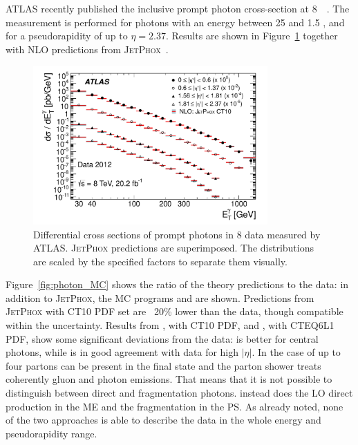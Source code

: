 \documentclass{PoS}
\providecommand{\JETPHOX} {{\textsc{JetPhox}}\xspace}
\begin{document}
ATLAS recently published the inclusive prompt photon cross-section at 8~\TeV~\cite{Aad:2016xcr}. The measurement is
performed for photons with an energy between 25 \GeV and 1.5 \TeV, and for a pseudorapidity of up to $\eta = 2.37$. 
Results are shown in Figure~\ref{fig:photon} together with NLO predictions from \JETPHOX~\cite{Catani:2002ny}. 
\begin{figure}
\begin{center}
\includegraphics[width=0.8\textwidth]{Figure11.pdf} 
\caption{Differential cross sections of prompt photons in 8 \TeV data measured by ATLAS. \JETPHOX predictions are superimposed. The
  distributions are scaled by the specified factors to separate them visually. }  
\label{fig:photon}
\end{center}
\end{figure}
Figure~\ref{fig:photon_MC} shows the ratio of the theory predictions to the data: in addition to \JETPHOX, the MC programs
\PYTHIA and \SHERPA are shown. Predictions from \JETPHOX with CT10 PDF set are ~20\% lower than the data, though compatible within the
uncertainty. Results from \SHERPA, with CT10 PDF, and \PYTHIA, with
CTEQ6L1 PDF, show some significant deviations from the data: \SHERPA is better for central photons, while
\PYTHIA is in good agreement with data for high $|\eta|$. In the case of \SHERPA up to four partons can be present in the
final state and the parton shower treats coherently gluon and photon emissions. That means that it is not possible to
distinguish between direct and fragmentation photons. \PYTHIA instead does the LO direct production in the ME and the
fragmentation in the PS. As already noted, none of the two approaches is able to describe the data in the whole energy
and pseudorapidity range.
\end{document}
